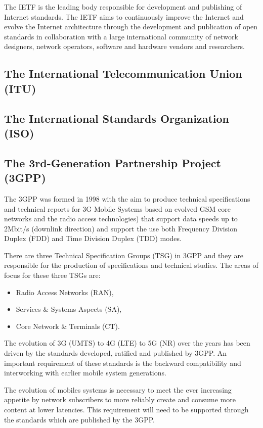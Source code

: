 The IETF is the leading body responsible for development and publishing of Internet standards. The IETF aims to continuously improve the Internet and evolve the Internet architecture through the development and publication of open standards in collaboration with a large international community of network designers, network operators, software and hardware vendors and researchers. 

\subsection{The International Telecommunication Union (ITU)}\label{ITU}



\subsection{The International Standards Organization (ISO)}

\subsection{The 3rd-Generation Partnership Project (3GPP)}

The 3GPP was formed in 1998 with the aim to produce technical specifications and technical reports for 3G Mobile Systems based on evolved GSM core networks and the radio access technologies) that support data speeds up to 2Mbit/s (downlink direction) and support the use both Frequency Division Duplex (FDD) and Time Division Duplex (TDD) modes. 

There are three Technical Specification Groups (TSG) in 3GPP and they are responsible for the production of specifications and technical studies. The areas of focus for these three TSGs are:

\begin{itemize}
\item Radio Access Networks (RAN),
\item Services \& Systems Aspects (SA),
\item Core Network \& Terminals (CT).
\end{itemize} 

The evolution of 3G (UMTS) to 4G (LTE) to 5G (NR) over the years has been driven by the standards developed, ratified and published by 3GPP. An important requirement of these standards is the backward compatibility and interworking with earlier mobile system generations. 

The evolution of mobiles systems is necessary to meet the ever increasing appetite by network subscribers to more reliably create and consume more content at lower latencies.  This requirement will need to be supported through the standards which are published by the 3GPP.    

